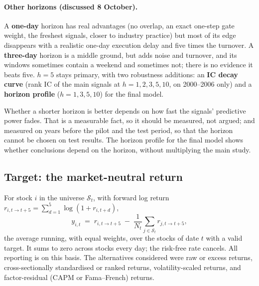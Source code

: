 \paragraph{Other horizons (discussed 8 October).} A \textbf{one-day} horizon has real advantages (no overlap,
an exact one-step gate weight, the freshest signals, closer to industry practice) but most of its edge
disappears with a realistic one-day execution delay and five times the turnover. A \textbf{three-day}
horizon is a middle ground, but adds noise and turnover, and its windows sometimes contain a weekend
and sometimes not; there is no evidence it beats five.  $h=5$ stays primary,
with two robustness additions: an \textbf{IC decay curve} (rank IC of the main signals at
$h=1,2,3,5,10$, on 2000--2006 only) and a \textbf{horizon profile} ($h=1,3,5,10$) for the final model.

\begin{whybox}
Whether a shorter horizon is better depends on how fast the signals' predictive power fades. That is a
measurable fact, so it should be measured, not argued; and measured on years before the pilot and the test
period, so that the horizon cannot be chosen on test results. The horizon profile for the final model shows
whether conclusions depend on the horizon, without multiplying the main study.
\end{whybox}

\subsection{Target: the market-neutral return}

 For stock $i$ in the universe $\mathcal S_t$, with forward log return
$r_{i,t\to t+5}=\sum_{d=1}^{5}\log(1+r_{i,t+d})$,
\begin{equation}
y_{i,t} \;=\; r_{i,t\to t+5} \;-\; \frac{1}{N_t}\sum_{j\in\mathcal S_t} r_{j,t\to t+5},
\end{equation}
the average running, with equal weights, over the stocks of date $t$ with a valid target. It sums to
zero across stocks every day; the risk-free rate cancels. All reporting is on this basis. 
The alternatives considered were raw or excess returns, cross-sectionally standardised or ranked returns,
volatility-scaled returns, and factor-residual (CAPM or Fama--French) returns.

